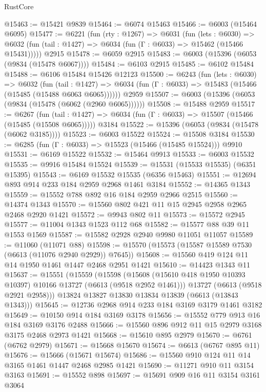 \begin{lexlean}{RustCore}
\begin{coremodule}
@15463 := @15421 @9839
@15464 := @6074 @15463
@15466 := @6003 (@15464 @6095)
@15477 := @6221
    (fun (rty : @1267) =>
    @6031
      (fun (lets : @6030) =>
      @6032 (fun (tail : @1427) => @6034 (fun (Γ : @6033) => @15462 (@15466 @15431)))))
    @2915
@15478 := @6059 @2915
@15483 := @6003 (@15396 (@6053 (@9834 (@15478 @6067))))
@15484 := @6103 @2915
@15485 := @6102 @15484
@15488 := @6106 @15484 @15426 @12123
@15500 := @6243
    (fun (lets : @6030) =>
    @6032
      (fun (tail : @1427) =>
      @6034 (fun (Γ : @6033) => @15483 (@15466 (@15485 (@15488 @6063 @6065))))))
    @2959
@15507 := @6003 (@15396 (@6053 (@9834 (@15478 (@6062 (@2960 @6065))))))
@15508 := @15488 @2959
@15517 := @6267
    (fun (tail : @1427) => @6034 (fun (Γ : @6033) => @15507 (@15466 (@15485 (@15508 @6065)))))
    @3184
@15522 := @15396 (@6053 (@9834 (@15478 (@6062 @3185))))
@15523 := @6003 @15522
@15524 := @15508 @3184
@15530 := @6285 (fun (Γ : @6033) => @15523 (@15466 (@15485 @15524))) @9910
@15531 := @6169 @15522
@15532 := @15464 @9913
@15533 := @6003 @15532
@15535 := @9916 @15484 @15524
@15539 := @15531 (@15533 @15535) (@6351 @15395)
@15543 := @6169 @15532 @15535 (@6356 @15463)
@15551 := @12694 @893 @914 @233 @184 @2959 @2968 @1461 @3184
@15552 := @14365 @1343
@15559 := @15552 @788 @892 @16 @184 @2959 @2966 @2515
@15560 := @14374 @1343
@15570 := @15560 @802 @421 @11 @15 @2945 @2958 @2965 @2468 @2920 @1421
@15572 := @9943 @802 @11
@15573 := @15572 @2945
@15577 := @11004 @1343 @1523 @112 @68
@15582 := @15577 @88 @39 @11 @1553 @1569
@15587 := @15582 @2928 @2940 @9980 @11051 @11057
@15589 := @11060 (@11071 @88)
@15598 := @15570 (@15573 (@15587 @15589 @7530 (@6613 (@11076 @2940 @2929)) @7645))
@15608 := @15560 @419 @124 @11 @14 @1950 @1461 @1447 @2468 @2951 @1421
@15610 := @14423 @1343 @11
@15637 := @15551
    (@15559
      (@15598
        (@15608 (@15610 @418 @1950 @10393 @10397) @10166 @13727 (@6613 (@9518 @2952 @1461)))
        @13727
        (@6613 (@9518 @2921 @2958)))
      @13824
      @13827
      @13830
      @13834
      @13839
      (@6613 (@13843 @1343)))
@15645 := @12736 @2968 @914 @233 @184 @3169 @3179 @1461 @3182
@15649 := @10150 @914 @184 @3169 @3178
@15656 := @15552 @779 @913 @16 @184 @3169 @3176 @2488
@15666 := @15560 @896 @912 @11 @15 @2979 @3168 @3175 @2468 @2973 @1421
@15668 := @15610 @895 @2979
@15670 := @6761 (@6762 @2979)
@15671 := @15668 @15670
@15674 := @6613 (@6767 @895 @11)
@15676 := @15666 (@15671 @15674)
@15686 := @15560 @910 @124 @11 @14 @3165 @1461 @1447 @2468 @2985 @1421
@15690 := @11271 @910 @11 @3154 @3163
@15691 := @15552 @898
@15697 := @15691 @909 @16 @11 @3154 @3161 @3064

\end{coremodule}
\end{lexlean}
